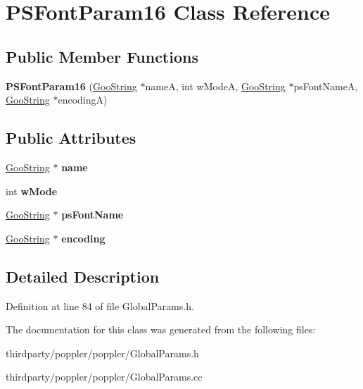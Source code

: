 \hypertarget{class_p_s_font_param16}{}\section{P\+S\+Font\+Param16 Class Reference}
\label{class_p_s_font_param16}
\subsection*{Public Member Functions}
\begin{DoxyCompactItemize}
\item 
\mbox{\label{class_p_s_font_param16_a6bde6a62e64e58bc469116457ec3be19}} 
{\bfseries P\+S\+Font\+Param16} (\hyperlink{class_goo_string}{Goo\+String} $\ast$nameA, int w\+ModeA, \hyperlink{class_goo_string}{Goo\+String} $\ast$ps\+Font\+NameA, \hyperlink{class_goo_string}{Goo\+String} $\ast$encodingA)
\end{DoxyCompactItemize}
\subsection*{Public Attributes}
\begin{DoxyCompactItemize}
\item 
\mbox{\label{class_p_s_font_param16_a3613515166cc1bad3a9927bae5963ef8}} 
\hyperlink{class_goo_string}{Goo\+String} $\ast$ {\bfseries name}
\item 
\mbox{\label{class_p_s_font_param16_a49e998eba061856a0c90dd9f13ce7f4c}} 
int {\bfseries w\+Mode}
\item 
\mbox{\label{class_p_s_font_param16_a958d20a5ef5bfb61e07870f9fe5bf5d6}} 
\hyperlink{class_goo_string}{Goo\+String} $\ast$ {\bfseries ps\+Font\+Name}
\item 
\mbox{\label{class_p_s_font_param16_a07d07359e23641d4aa6ba6e4e59d55eb}} 
\hyperlink{class_goo_string}{Goo\+String} $\ast$ {\bfseries encoding}
\end{DoxyCompactItemize}


\subsection{Detailed Description}


Definition at line 84 of file Global\+Params.\+h.



The documentation for this class was generated from the following files\+:\begin{DoxyCompactItemize}
\item 
thirdparty/poppler/poppler/Global\+Params.\+h\item 
thirdparty/poppler/poppler/Global\+Params.\+cc\end{DoxyCompactItemize}
